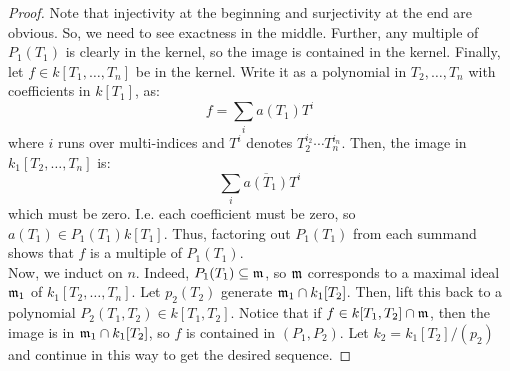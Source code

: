 \begin{proof}
	Note that injectivity at the beginning and surjectivity at the end are obvious. So, we need to see exactness in the middle. Further, any multiple of $P_1(T_1)$ is clearly in the kernel, so the image is contained in the kernel. Finally, let $f \in k[T_1,\ldots,T_n]$ be in the kernel. Write it as a polynomial in $T_2,\ldots,T_n$ with coefficients in $k[T_1]$, as:
	\[ f = \sum_i a(T_1)T^i \]
	where $i$ runs over multi-indices and $T^i$ denotes $T_2^{i_2} \cdots T_n^{i_n}$. Then, the image in $k_1[T_2,\ldots,T_n]$ is:
	\[ \sum_i \overline{a(T_1)}T^i \]
	which must be zero. I.e. each coefficient must be zero, so $a(T_1) \in P_1(T_1)k[T_1]$. Thus, factoring out $P_1(T_1)$ from each summand shows that $f$ is a multiple of $P_1(T_1)$. \\
	
	Now, we induct on $n$. Indeed, $P_1(T_1) \subseteq \mathfrak{m}$, so $\mathfrak{m}$ corresponds to a maximal ideal $\mathfrak{m}_1$ of $k_1[T_2,\ldots,T_n]$. Let $p_2(T_2)$ generate $\mathfrak{m}_1 \cap k_1[T_2]$. Then, lift this back to a polynomial $P_2(T_1,T_2) \in k[T_1,T_2]$. Notice that if $f \in k[T_1,T_2] \cap \mathfrak{m}$, then the image is in $\mathfrak{m}_1 \cap k_1[T_2]$, so $f$ is contained in $(P_1,P_2)$. Let $k_2 = k_1[T_2]/(p_2)$ and continue in this way to get the desired sequence.
\end{proof}
